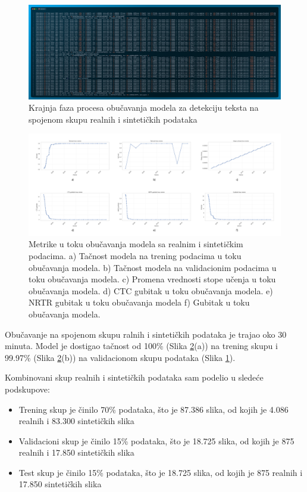 \documentclass[a4paper,12pt]{article}
\begin{document}
	\begin{figure}[H]
		\centering
		\includegraphics[width=\textwidth]{assets/train-code-real-and-synthetic-data.png}
		\caption{Krajnja faza procesa obučavanja modela za detekciju teksta na spojenom skupu realnih i sintetičkih podataka}
		\label{fig:train-code-real-and-synthetic-data}
	\end{figure}

	\begin{figure}[H]
		\centering
		\includegraphics[width=\textwidth]{assets/real-and-synthetic-data-metrics.png}
		\caption{Metrike u toku obučavanja modela sa realnim i sintetičkim podacima. a) Tačnost modela na trening podacima u toku obučavanja modela. b) Tačnost modela na validacionim podacima u toku obučavanja modela. c) Promena vrednosti stope učenja u toku obučavanja modela. d) CTC gubitak u toku obučavanja modela. e) NRTR gubitak u toku obučavanja modela f) Gubitak u toku obučavanja modela.}
		\label{fig:real-and-synthetic-data-metrics}
	\end{figure}
	
	Obučavanje na spojenom skupu ralnih i sintetičkih podataka je trajao oko 30 minuta. Model je dostigao tačnost od 100\% (Slika \ref{fig:real-and-synthetic-data-metrics}(a)) na trening skupu i 99.97\% (Slika \ref{fig:real-and-synthetic-data-metrics}(b)) na validacionom skupu podataka (Slika \ref{fig:train-code-real-and-synthetic-data}).\newline
	
	Kombinovani skup realnih i sintetičkih podataka sam podelio u sledeće podskupove:
	\begin{itemize}
		\item Trening skup je činilo 70\% podataka, što je 87.386 slika, od kojih je 4.086 realnih i 83.300 sintetičkih slika
		\item Validacioni skup je činilo 15\% podataka, što je 18.725 slika, od kojih je 875 realnih i 17.850 sintetičkih slika
		\item Test skup je činilo 15\% podataka, što je 18.725 slika, od kojih je 875 realnih i 17.850 sintetičkih slika
	\end{itemize}
	
\end{document}
